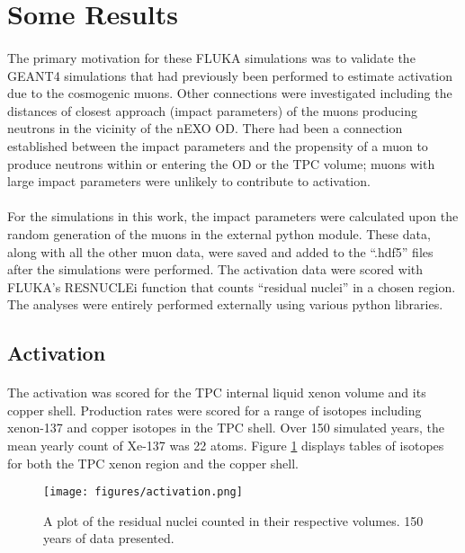 \section{Some Results}
\paragraph{}
The primary motivation for these FLUKA simulations was to validate the GEANT4 simulations that had previously been performed to estimate activation due to the cosmogenic muons. Other connections were investigated including the distances of closest approach (impact parameters) of the muons producing neutrons in the vicinity of the nEXO OD. There had been a connection established between the impact parameters and the propensity of a muon to produce neutrons within or entering the OD or the TPC volume; muons with large impact parameters were unlikely to contribute to activation.

\paragraph{}
For the simulations in this work, the impact parameters were calculated upon the random generation of the muons in the external python module. These data, along with all the other muon data, were saved and added to the ``.hdf5'' files after the simulations were performed. The activation data were scored with FLUKA's RESNUCLEi function that counts ``residual nuclei'' in a chosen region. The analyses were entirely performed externally using various python libraries.

\subsection{Activation}

\paragraph{}
The activation was scored for the TPC internal liquid xenon volume and its copper shell. Production rates were scored for a range of isotopes including xenon-137 and copper isotopes in the TPC shell. Over 150 simulated years, the mean yearly count of Xe-137 was 22 atoms. Figure \ref{fig:activation} displays tables of isotopes for both the TPC xenon region and the copper shell.

\begin{figure}[h]
    \begin{center}
    \texttt{[image: figures/activation.png]}
    \caption{A plot of the residual nuclei counted in their respective volumes. 150 years of data presented.}
    \label{fig:activation}
    \end{center}
\end{figure}

